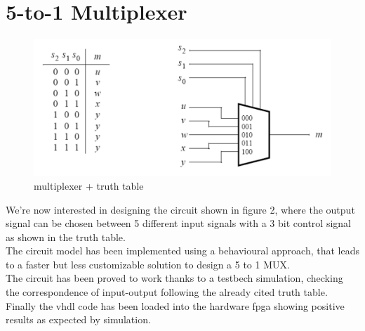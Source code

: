 \documentclass[12pt]{article}
\begin{document}
\section{5-to-1 Multiplexer}
\begin{figure}[h]
	\centering
	\includegraphics[scale = 0.3]{image1.jpg}
	\caption{multiplexer + truth table}
\end{figure}
We're now interested in designing the circuit shown in figure 2, where the output signal can be chosen between 5 different input signals with a 3 bit control signal as shown in the truth table. \\The circuit model has been implemented using a behavioural approach, that leads to a faster but less customizable solution to design a 5 to 1 MUX.\\
The circuit has been proved to work thanks to a testbech simulation, checking the correspondence of input-output following the already cited truth table. \\
Finally the vhdl code has been loaded into the hardware fpga showing positive results as expected by simulation.
\end{document}
